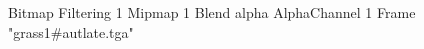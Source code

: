 {Bitmap
	{Filtering 1}
	{Mipmap 1}
	{Blend alpha}
	{AlphaChannel 1}
	{Frame "grass1#autlate.tga"}
}
